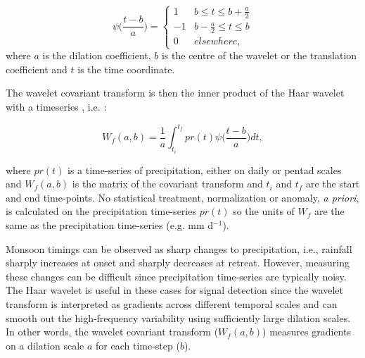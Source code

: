 \begin{equation}
\psi \bigg(\frac{t-b}{a}\bigg)=
\begin{cases}
      1 & b\leq t \leq b+\frac{a}{2} \\
      -1 & b-\frac{a}{2} \leq t \leq b \\
      0 & elsewhere,
   \end{cases}
   \label{eq:haar}
\end{equation}
%
\noindent where $a$ is the dilation coefficient, $b$ is the centre of the wavelet or the translation coefficient and $t$ is the time coordinate.

The wavelet covariant transform is then the inner product of the Haar wavelet with a timeseries \citep{brooks2003}, i.e. :

\begin{equation}
W_f(a,b)=\frac{1}{a}\int_{t_i}^{t_f}pr(t)\psi \bigg(\frac{t-b}{a}\bigg) dt,
   \label{eq:wf}
\end{equation}

\noindent where $pr(t)$ is a time-series of precipitation, either on daily or pentad scales and $W_f(a,b)$ is the matrix of the covariant transform and $t_i$ and $t_f$ are the start and end time-points. No statistical treatment, normalization or anomaly, \textit{a priori}, is calculated on the precipitation time-series $pr(t)$ so the units of $W_f$ are the same as the precipitation time-series (e.g. mm d$^{-1}$).

 Monsoon timings can be observed as sharp changes to precipitation, i.e., rainfall sharply increases at onset and sharply decreases at retreat. However, measuring these changes can be difficult since precipitation time-series are typically noisy. The Haar wavelet is useful in these cases for signal detection since the wavelet transform is interpreted as  gradients across different temporal scales and can smooth out the high-frequency variability using sufficiently large dilation scales. 
  In other words, the wavelet covariant transform ($W_f(a,b)$) measures gradients on a dilation scale $a$ for each time-step ($b$).
  

